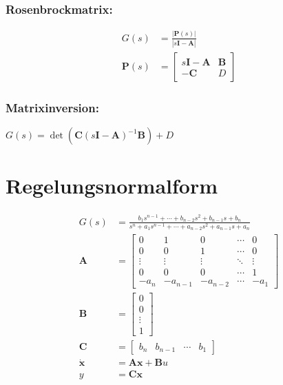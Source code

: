 \documentclass[11pt,a4paper,fleqn,headsepline]{scrreprt}
\begin{document}
\begin{multicols}{2}
        \subsubsection*{Rosenbrockmatrix:}
        \begin{align*}
            G(s) &= \frac{\left|\mathbf{P}(s)\right|}{\left|s\mathbf{I} - \mathbf{A} \right|} \\
            \mathbf{P}(s) &= \begin{bmatrix}
                s\mathbf{I} - \mathbf{A} & \mathbf{B} \\
                -\mathbf{C} & D
            \end{bmatrix}
        \end{align*}

        \subsubsection*{Matrixinversion:}

        \(G(s) = \det(\mathbf{C}{(s\mathbf{I} - \mathbf{A})}^{-1}\mathbf{B})+D\)

        \section*{Regelungsnormalform}
        \begin{align*}
            G(s) &= \frac{b_1 s^{n-1} + \cdots + b_{n-2} s^2 + b_{n-1} s + b_n}{s^n + a_1 s^{n-1} + \cdots + a_{n-2} s^2 + a_{n-1} s + a_n} \\
            \mathbf{A} &= \begin{bmatrix}
                0 & 1 & 0 & \cdots & 0 \\
                0 & 0 & 1 & \cdots & 0 \\
                \vdots & \vdots & \vdots & \ddots & \vdots \\
                0 & 0 & 0 & \cdots & 1 \\
                -a_n & -a_{n-1} & -a_{n-2} & \cdots & -a_1
            \end{bmatrix} \\
            \mathbf{B} &= \begin{bmatrix}
                0 \\ 0 \\ \vdots \\ 1
            \end{bmatrix} \\
            \mathbf{C} &= \begin{bmatrix}
                b_n & b_{n-1} & \cdots & b_1
            \end{bmatrix} \\
            \dot{\mathbf{x}} &= \mathbf{A} \mathbf{x} + \mathbf{B} u \\
            y &= \mathbf{C} \mathbf{x} \\
        \end{align*}


\end{multicols}
\end{document}
